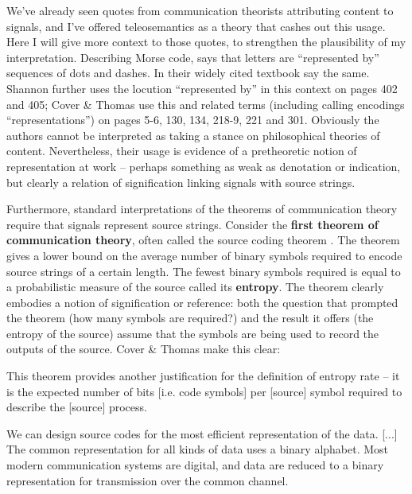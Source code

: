 \documentclass[12pt]{article}
\begin{document}
We've already seen quotes from communication theorists attributing content to signals, and I've offered teleosemantics as a theory that cashes out this usage.
Here I will give more context to those quotes, to strengthen the plausibility of my interpretation.
Describing Morse code, \citet[385]{shannon1948mathematicalc} says that letters are ``represented by'' sequences of dots and dashes.
In their widely cited textbook \citet[105]{cover2006elements} say the same.
Shannon further uses the locution ``represented by'' in this context on pages 402 and 405; Cover \& Thomas use this and related terms (including calling encodings ``representations'') on pages 5-6, 130, 134, 218-9, 221 and 301.
Obviously the authors cannot be interpreted as taking a stance on philosophical theories of content.
Nevertheless, their usage is evidence of a pretheoretic notion of representation at work -- perhaps something as weak as denotation or indication, but clearly a relation of signification linking signals with source strings.

Furthermore, standard interpretations of the theorems of communication theory require that signals represent source strings.
Consider the \textbf{first theorem of communication theory}, often called the source coding theorem \citep[$\S$5]{cover2006elements} \citep[$\S$4]{mackay2003information}.
The theorem gives a lower bound on the average number of binary symbols required to encode source strings of a certain length.
The fewest binary symbols required is equal to a probabilistic measure of the source called its \textbf{entropy}.
The theorem clearly embodies a notion of signification or reference: both the question that prompted the theorem (how many symbols are required?) and the result it offers (the entropy of the source) assume that the symbols are being used to record the outputs of the source.
Cover \& Thomas make this clear:

\begin{myquote}
This theorem provides another justification for the definition of entropy rate -- it is the expected number of bits [i.e. code symbols] per [source] symbol required to describe the [source] process.
\par\hspace*{\fill}\citet[115]{cover2006elements}
\end{myquote}

\begin{myquote}
We can design source codes for the most efficient representation of the data. [...] The common representation for all kinds of data uses a binary alphabet. Most modern communication systems are digital, and data are reduced to a binary representation for transmission over the common channel.
\par\hspace*{\fill}\citet[218]{cover2006elements}
\end{myquote}
\end{document}
